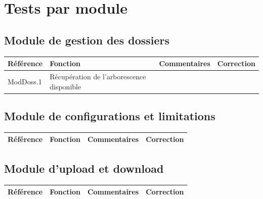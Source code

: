 \documentclass[10pt,a4paper,landscape]{report}
\begin{document}

\section{Tests par module}

\subsection{Module de gestion des dossiers}

\begin{center}
	\bgroup
	\def\arraystretch{1.5}
	\begin{tabular}{|p{2.5cm}|p{8cm}|p{8cm}|p{8cm}|}
		\hline
		\rowcolor{gris}Référence & Fonction & Commentaires & Correction\\
		\hline
		ModDoss.1 & Récupération de l'arborescence disponible & & \\
		\hline
	\end{tabular}
	\egroup
\end{center}


\subsection{Module de configurations et limitations}

\begin{center}
	\bgroup
	\def\arraystretch{1.5}
	\begin{tabular}{|p{2.5cm}|p{8cm}|p{8cm}|p{8cm}|}
		\hline
		\rowcolor{gris}Référence & Fonction & Commentaires & Correction\\
		\hline
		
		\hline
	\end{tabular}
	\egroup
\end{center}


\subsection{Module d'upload et download}

\begin{center}
	\bgroup
	\def\arraystretch{1.5}
	\begin{tabular}{|p{2.5cm}|p{8cm}|p{8cm}|p{8cm}|}
		\hline
		\rowcolor{gris}Référence & Fonction & Commentaires & Correction\\
		\hline
		
		\hline
	\end{tabular}
	\egroup
\end{center}
\end{document}
